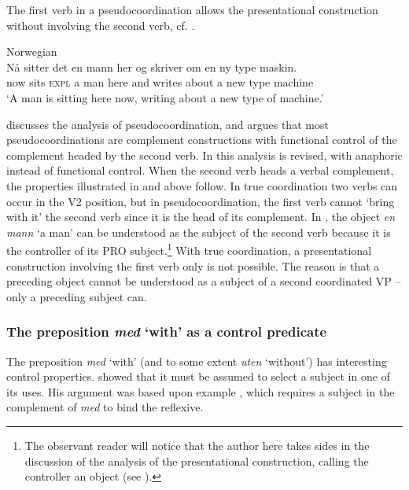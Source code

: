 \documentclass[output=paper,hidelinks]{langscibook}
\begin{document}
\noindent The first verb in a pseudocoordination allows the presentational construction without involving the second verb, cf. .



\ea\label{ex:Scandinavian:70} Norwegian \citep[92]{Lodrup19}\\
\gll
 {Nå} {sitter} {det} {en} {mann} {her} {og} {skriver} {om} {en} {ny} {type} {maskin.}\\
 now sits \textsc{expl} a man here and writes about a new type machine \\
\glt `A man is sitting here now, writing about a new type of machine.' \z

\noindent \citet{Lodrup02} discusses the analysis of pseudocoordination, and argues that most pseudocoordinations are complement constructions with functional control of the complement headed by the second verb. In \citet{Lodrup17} this analysis is revised, with anaphoric instead of functional control. When the second verb heads a verbal complement, the properties illustrated in  and  above follow. In true coordination two verbs can occur in the V2 position, but in pseudocoordination, the first verb cannot `bring with it' the second verb since it is the head of its complement. In , the object \textit{en} \textit{mann} `a man' can be understood as the subject of the second verb because it is the controller of its PRO subject.\footnote{The observant reader will notice that the author here takes sides in the discussion of the analysis of the presentational  construction, calling the controller an object (see ).} With true coordination, a presentational construction involving the first verb only is not possible. The reason is that a preceding object cannot be understood as a subject of a second coordinated VP -- only a preceding subject can.

\subsubsection{The preposition \textit{med} `with' as a control predicate}

The preposition \textit{med} `with' (and to some extent \textit{uten} `without') has interesting control properties. \citet{Lodrup99b} showed that it must be assumed to select a subject in one of its uses. His argument was based upon example , which requires a subject in the complement of \textit{med} to bind the reflexive.
\end{document}
